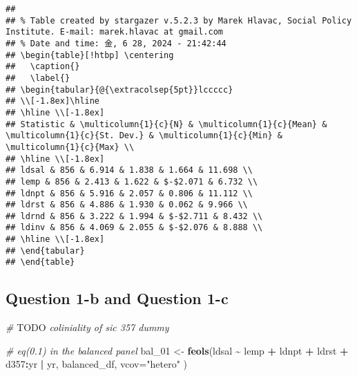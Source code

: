 \documentclass[
]{article}
\newenvironment{Shaded}{\begin{snugshade}}{\end{snugshade}}
\newcommand{\AlertTok}[1]{\textcolor[rgb]{0.94,0.16,0.16}{#1}}
\newcommand{\AttributeTok}[1]{\textcolor[rgb]{0.13,0.29,0.53}{#1}}
\newcommand{\CommentTok}[1]{\textcolor[rgb]{0.56,0.35,0.01}{\textit{#1}}}
\newcommand{\FunctionTok}[1]{\textcolor[rgb]{0.13,0.29,0.53}{\textbf{#1}}}
\newcommand{\NormalTok}[1]{#1}
\newcommand{\OtherTok}[1]{\textcolor[rgb]{0.56,0.35,0.01}{#1}}
\newcommand{\SpecialCharTok}[1]{\textcolor[rgb]{0.81,0.36,0.00}{\textbf{#1}}}
\newcommand{\StringTok}[1]{\textcolor[rgb]{0.31,0.60,0.02}{#1}}
\begin{document}
\begin{verbatim}
## 
## % Table created by stargazer v.5.2.3 by Marek Hlavac, Social Policy Institute. E-mail: marek.hlavac at gmail.com
## % Date and time: 金, 6 28, 2024 - 21:42:44
## \begin{table}[!htbp] \centering 
##   \caption{} 
##   \label{} 
## \begin{tabular}{@{\extracolsep{5pt}}lccccc} 
## \\[-1.8ex]\hline 
## \hline \\[-1.8ex] 
## Statistic & \multicolumn{1}{c}{N} & \multicolumn{1}{c}{Mean} & \multicolumn{1}{c}{St. Dev.} & \multicolumn{1}{c}{Min} & \multicolumn{1}{c}{Max} \\ 
## \hline \\[-1.8ex] 
## ldsal & 856 & 6.914 & 1.838 & 1.664 & 11.698 \\ 
## lemp & 856 & 2.413 & 1.622 & $-$2.071 & 6.732 \\ 
## ldnpt & 856 & 5.916 & 2.057 & 0.806 & 11.112 \\ 
## ldrst & 856 & 4.886 & 1.930 & 0.062 & 9.966 \\ 
## ldrnd & 856 & 3.222 & 1.994 & $-$2.711 & 8.432 \\ 
## ldinv & 856 & 4.069 & 2.055 & $-$2.076 & 8.888 \\ 
## \hline \\[-1.8ex] 
## \end{tabular} 
## \end{table}
\end{verbatim}

\hypertarget{question-1-b-and-question-1-c}{%
\subsection{Question 1-b and Question
1-c}\label{question-1-b-and-question-1-c}}

\begin{Shaded}
\begin{Highlighting}[]
\CommentTok{\# }\AlertTok{TODO}\CommentTok{ coliniality of sic 357 dummy}

\CommentTok{\# eq(0.1) in the balanced panel}
\NormalTok{bal\_01 }\OtherTok{\textless{}{-}} \FunctionTok{feols}\NormalTok{(ldsal }\SpecialCharTok{\textasciitilde{}}\NormalTok{  lemp }\SpecialCharTok{+}\NormalTok{ ldnpt }\SpecialCharTok{+}\NormalTok{ ldrst }\SpecialCharTok{+}\NormalTok{ d357}\SpecialCharTok{:}\NormalTok{yr }\SpecialCharTok{|}\NormalTok{ yr, }
\NormalTok{               balanced\_df, }\AttributeTok{vcov=}\StringTok{"hetero"}
\NormalTok{)}
\end{Highlighting}
\end{Shaded}
\end{document}
